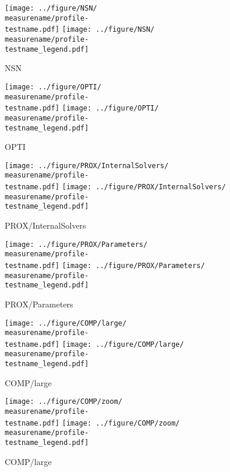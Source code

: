 \documentclass[a4paper]{article}
\begin{document}
\begin{figure}[htbp]
  \centering
  \texttt{[image: ../figure/NSN/\\measurename/profile-\\testname.pdf]}
  \texttt{[image: ../figure/NSN/\\measurename/profile-\\testname\_legend.pdf]}
\caption{\testnamechar{  } \measurename { }NSN}
\end{figure}

\begin{figure}[htbp]
  \centering
  \texttt{[image: ../figure/OPTI/\\measurename/profile-\\testname.pdf]}
  \texttt{[image: ../figure/OPTI/\\measurename/profile-\\testname\_legend.pdf]}
\caption{\testnamechar{  } \measurename { }OPTI}
\end{figure}

\begin{figure}[htbp]
  \centering
  \texttt{[image: ../figure/PROX/InternalSolvers/\\measurename/profile-\\testname.pdf]}
  \texttt{[image: ../figure/PROX/InternalSolvers/\\measurename/profile-\\testname\_legend.pdf]}
\caption{\testnamechar{  } \measurename { }PROX/InternalSolvers}
\end{figure}

\begin{figure}[htbp]
  \centering
  \texttt{[image: ../figure/PROX/Parameters/\\measurename/profile-\\testname.pdf]}
  \texttt{[image: ../figure/PROX/Parameters/\\measurename/profile-\\testname\_legend.pdf]}
\caption{\testnamechar{  } \measurename { }PROX/Parameters}
\end{figure}


\begin{figure}[htbp]
  \centering
  \texttt{[image: ../figure/COMP/large/\\measurename/profile-\\testname.pdf]}
  \texttt{[image: ../figure/COMP/large/\\measurename/profile-\\testname\_legend.pdf]}
\caption{\testnamechar{  } \measurename { }COMP/large}
\end{figure}


\begin{figure}[htbp]
  \centering
  \texttt{[image: ../figure/COMP/zoom/\\measurename/profile-\\testname.pdf]}
  \texttt{[image: ../figure/COMP/zoom/\\measurename/profile-\\testname\_legend.pdf]}
\caption{\testnamechar{  } \measurename { }COMP/large}
\end{figure}


\clearpage
\def\testname{LMGC_945_SP_Box_PL}
\def\testnamechar{LMGC\_945\_SP\_Box\_PL}
\end{document}
